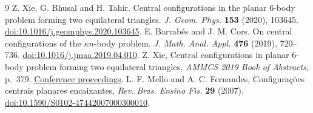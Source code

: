 \documentclass[10pt]{article}
\begin{document}
\begin{thebibliography}{9}
 Z. Xie, G. Bhusal and H. Tahir.
Central configurations in the planar 6-body problem forming two equilateral triangles.
\emph{J. Geom. Phys.} \textbf{153} (2020), 103645.
\href{https://doi.org/10.1016/j.geomphys.2020.103645}{doi:10.1016/j.geomphys.2020.103645}.
 E. Barrab\'es and J. M. Cors.
On central configurations of the $\kappa n$-body problem.
\emph{J. Math. Anal. Appl.} \textbf{476} (2019), 720--736.
\href{https://doi.org/10.1016/j.jmaa.2019.04.010}{doi:10.1016/j.jmaa.2019.04.010}.
 Z. Xie, Central configurations in planar 6-body problem forming two equilateral triangles, \emph{AMMCS 2019 Book of Abstracts}, p.~379. \href{https://ammcs.wlu.ca/2019/conference-program/ammcs2019_boa.pdf}{Conference proceedings}.
 L. F. Mello and A. C. Fernandes, Configura\c c\~oes centrais planares encaixantes, \emph{Rev. Bras. Ensino F\'{\i}s.} \textbf{29} (2007). \href{https://doi.org/10.1590/S0102-47442007000300010}{doi:10.1590/S0102-47442007000300010}.
\end{thebibliography}
\end{document}
